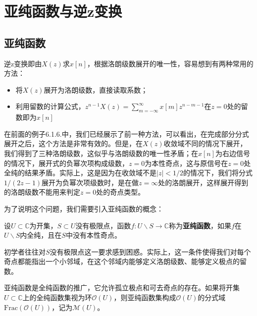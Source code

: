 \section{亚纯函数与逆z变换}\label{sec:Inverse_z_Transform}

\subsection{亚纯函数}\label{sub:meromorphic_function}
逆z变换即由$X(z)$求$x[n]$，根据洛朗级数展开的唯一性，容易想到有两种常用的方法：
\begin{itemize}
    \item 将$X(z)$展开为洛朗级数，直接读取系数；
    \item 利用留数的计算公式，$z^{n-1} X(z)=\sum_{m=-\infty}^{\infty} x[m] z^{n-m-1}$在$z=0$处的留数即为$x[n]$
\end{itemize}

在前面的例子6.1.6.中，我们已经展示了前一种方法，可以看出，在完成部分分式展开之后，这个方法是非常有效的。但是，在$X(z)$收敛域不同的情况下展开，我们得到了三种洛朗级数，这似乎与洛朗级数的唯一性矛盾；在$x[n]$为右边信号的情况下，展开式的负幂次项构成级数，$z=0$为本性奇点，这与原信号在$z=0$处全纯的结果矛盾。实际上，这是因为在收敛域不是$|z|<1/2$的情况下，我们将分式$1/(2z-1)$展开为负幂次项级数时，是在做$z=\infty$处的洛朗展开，这样展开得到的洛朗级数不能用来判定$z=0$处的奇点类型。

为了说明这个问题，我们需要引入亚纯函数的概念\cite{Function_Theory}：
\begin{definition}[亚纯函数]
    设$U\subset\mathbb{C}$为开集，$S\subset U$没有极限点，函数$f:U\backslash S\to\mathbb{C}$称为\textbf{亚纯函数}，如果$f$在$U\backslash S$内全纯，且在$S$中没有本性奇点。
\end{definition}

初学者往往对$S$没有极限点这一要求感到困惑。实际上，这一条件使得我们对每个奇点都能指出一个小邻域，在这个邻域内能够定义洛朗级数、能够定义极点的留数。

亚纯函数是全纯函数的推广，它允许孤立极点和可去奇点的存在。如果将开集$U\subset \mathbb{C}$上的全纯函数集视为环$\mathcal{O} (U)$，则亚纯函数集构成$\mathcal{O} (U)$的分式域$\mathrm{Frac}(\mathcal{O} (U))$，记为$\mathcal{M} (U)$。

